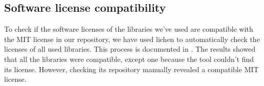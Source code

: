 \subsection{Software license compatibility}
To check if the software licenses of the libraries we've used are compatible with the MIT license in our repository, we have used lichen \cite{tool:lichen} to automatically check the licenses of all used libraries. This process is documented in . The results showed that all the libraries were compatible, except one because the tool couldn't find its license. However, checking its repository manually revealed a compatible MIT license.
